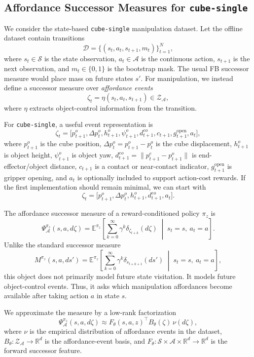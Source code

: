 \subsection{Affordance Successor Measures for \texttt{cube-single}}

We consider the state-based \texttt{cube-single} manipulation dataset.  Let the
offline dataset contain transitions
\[
\mathcal{D}
=
\{(s_t,a_t,s_{t+1},m_t)\}_{t=1}^N,
\]
where \(s_t\in\mathcal{S}\) is the state observation, \(a_t\in\mathcal{A}\) is the
continuous action, \(s_{t+1}\) is the next observation, and \(m_t\in\{0,1\}\)
is the bootstrap mask.  The usual FB successor measure would place mass on
future states \(s'\).  For manipulation, we instead define a successor measure
over \emph{affordance events}
\[
\zeta_t = \eta(s_t,a_t,s_{t+1}) \in \mathcal{Z}_{\mathcal{A}},
\]
where \(\eta\) extracts object-control information from the transition.

For \texttt{cube-single}, a useful event representation is
\[
\zeta_t
=
\Big[
p_{t+1}^{o},
\Delta p_t^{o},
h_{t+1}^{o},
\psi_{t+1}^{o},
d_{t+1}^{eo},
c_{t+1},
g_{t+1}^{\mathrm{open}},
a_t
\Big],
\]
where \(p_{t+1}^{o}\) is the cube position, \(\Delta p_t^{o}=p_{t+1}^{o}-p_t^{o}\)
is the cube displacement, \(h_{t+1}^{o}\) is object height, \(\psi_{t+1}^{o}\)
is object yaw, \(d_{t+1}^{eo}=\|p_{t+1}^{e}-p_{t+1}^{o}\|\) is end-effector/object
distance, \(c_{t+1}\) is a contact or near-contact indicator, \(g_{t+1}^{\mathrm{open}}\)
is gripper opening, and \(a_t\) is optionally included to support action-cost
rewards.  If the first implementation should remain minimal, we can start with
\[
\zeta_t
=
\Big[
p_{t+1}^{o},
\Delta p_t^{o},
h_{t+1}^{o},
d_{t+1}^{eo},
a_t
\Big].
\]

The affordance successor measure of a reward-conditioned policy \(\pi_z\) is
\[
\Psi_{\mathcal{A}}^{\pi_z}(s,a,d\zeta)
=
\mathbb{E}^{\pi_z}
\left[
\sum_{k=0}^{\infty}
\gamma^k
\delta_{\zeta_{t+k}}(d\zeta)
\;\middle|\;
s_t=s,\ a_t=a
\right].
\]
Unlike the standard successor measure
\[
M^{\pi_z}(s,a,ds')
=
\mathbb{E}^{\pi_z}
\left[
\sum_{k=0}^{\infty}
\gamma^k
\delta_{s_{t+k+1}}(ds')
\;\middle|\;
s_t=s,\ a_t=a
\right],
\]
this object does not primarily model future state visitation.  It models future
object-control events.  Thus, it asks which manipulation affordances become
available after taking action \(a\) in state \(s\).

We approximate the measure by a low-rank factorization
\[
\Psi_{\mathcal{A}}^{\pi_z}(s,a,d\zeta)
\approx
F_\theta(s,a,z)^\top B_\theta(\zeta)\,\nu(d\zeta),
\]
where \(\nu\) is the empirical distribution of affordance events in the dataset,
\(B_\theta:\mathcal{Z}_{\mathcal{A}}\to\mathbb{R}^d\) is the affordance-event basis,
and \(F_\theta:\mathcal{S}\times\mathcal{A}\times\mathbb{R}^d\to\mathbb{R}^d\)
is the forward successor feature.

